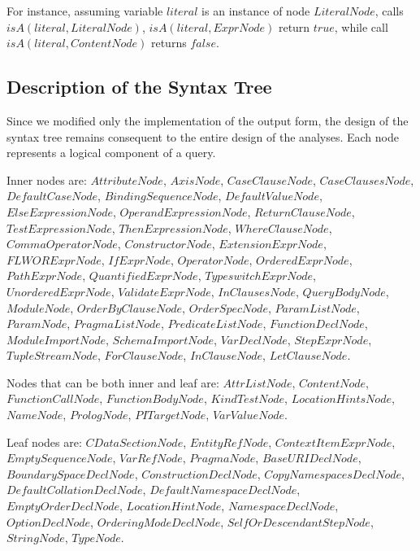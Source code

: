 For instance, assuming variable $literal$ is an instance of node $LiteralNode$, calls $isA(literal, LiteralNode)$, $isA(literal, ExprNode)$ return $true$, while call $isA(literal, ContentNode)$ returns $false$.

\subsection{Description of the Syntax Tree}
Since we modified only the implementation of the output form, the design of the syntax tree remains consequent to the entire design of the analyses. Each node represents a logical component of a query. 

Inner nodes are: $AttributeNode$, $AxisNode$, $CaseClauseNode$, $CaseClausesNode$, $DefaultCaseNode$, $BindingSequenceNode$, $DefaultValueNode$, $ElseExpressionNode$, $OperandExpressionNode$, $ReturnClauseNode$, $TestExpressionNode$, $ThenExpressionNode$, $WhereClauseNode$, $CommaOperatorNode$, $ConstructorNode$, $ExtensionExprNode$, $FLWORExprNode$, $IfExprNode$, $OperatorNode$, $OrderedExprNode$, $PathExprNode$, $QuantifiedExprNode$, $TypeswitchExprNode$, $UnorderedExprNode$, $ValidateExprNode$, $InClausesNode$, $QueryBodyNode$, $ModuleNode$, $OrderByClauseNode$, $OrderSpecNode$, $ParamListNode$, $ParamNode$, $PragmaListNode$, $PredicateListNode$, $FunctionDeclNode$, $ModuleImportNode$, $SchemaImportNode$, $VarDeclNode$, $StepExprNode$, $TupleStreamNode$, $ForClauseNode$, $InClauseNode$, $LetClauseNode$.

Nodes that can be both inner and leaf are: $AttrListNode$, $ContentNode$, $FunctionCallNode$, $FunctionBodyNode$, $KindTestNode$, $LocationHintsNode$, $NameNode$, $PrologNode$, $PITargetNode$, $VarValueNode$.

Leaf nodes are: $CDataSectionNode$, $EntityRefNode$, $ContextItemExprNode$, $EmptySequenceNode$, $VarRefNode$, $PragmaNode$, $BaseURIDeclNode$, $BoundarySpaceDeclNode$, $ConstructionDeclNode$, $CopyNamespacesDeclNode$, $DefaultCollationDeclNode$, $DefaultNamespaceDeclNode$, $EmptyOrderDeclNode$, $LocationHintNode$, $NamespaceDeclNode$, $OptionDeclNode$, $OrderingModeDeclNode$, $SelfOrDescendantStepNode$, $StringNode$, $TypeNode$.


